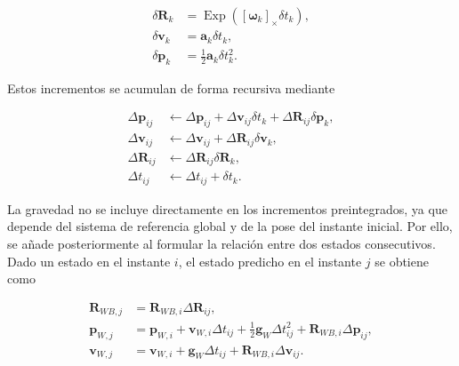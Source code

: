\begin{equation}
\begin{aligned}
    \delta \mathbf{R}_{k}
    &=
    \operatorname{Exp}
    \left(
        \left[
            \boldsymbol{\omega}_k
        \right]_{\times}
        \delta t_k
    \right),
    \\
    \delta \mathbf{v}_{k}
    &=
    \mathbf{a}_k
    \delta t_k,
    \\
    \delta \mathbf{p}_{k}
    &=
    \frac{1}{2}
    \mathbf{a}_k
    \delta t_k^2.
\end{aligned}
\end{equation}

Estos incrementos se acumulan de forma recursiva mediante

\begin{equation}
\begin{aligned}
    \Delta \mathbf{p}_{ij}
    &\leftarrow
    \Delta \mathbf{p}_{ij}
    +
    \Delta \mathbf{v}_{ij}
    \delta t_k
    +
    \Delta \mathbf{R}_{ij}
    \delta \mathbf{p}_{k},
    \\
    \Delta \mathbf{v}_{ij}
    &\leftarrow
    \Delta \mathbf{v}_{ij}
    +
    \Delta \mathbf{R}_{ij}
    \delta \mathbf{v}_{k},
    \\
    \Delta \mathbf{R}_{ij}
    &\leftarrow
    \Delta \mathbf{R}_{ij}
    \delta \mathbf{R}_{k},
    \\
    \Delta t_{ij}
    &\leftarrow
    \Delta t_{ij}
    +
    \delta t_k.
\end{aligned}
\label{eq:preintegracion_imu}
\end{equation}

La gravedad no se incluye directamente en los incrementos preintegrados, ya que depende del sistema de referencia global y de la pose 
del instante inicial. Por ello, se añade posteriormente al formular la relación entre dos estados consecutivos. Dado un estado en el 
instante $i$, el estado predicho en el instante $j$ se obtiene como

\begin{equation}
\begin{aligned}
    \mathbf{R}_{WB,j}
    &=
    \mathbf{R}_{WB,i}
    \Delta \mathbf{R}_{ij},
    \\
    \mathbf{p}_{W,j}
    &=
    \mathbf{p}_{W,i}
    +
    \mathbf{v}_{W,i}
    \Delta t_{ij}
    +
    \frac{1}{2}
    \mathbf{g}_{W}
    \Delta t_{ij}^{2}
    +
    \mathbf{R}_{WB,i}
    \Delta \mathbf{p}_{ij},
    \\
    \mathbf{v}_{W,j}
    &=
    \mathbf{v}_{W,i}
    +
    \mathbf{g}_{W}
    \Delta t_{ij}
    +
    \mathbf{R}_{WB,i}
    \Delta \mathbf{v}_{ij}.
\end{aligned}
\end{equation}

